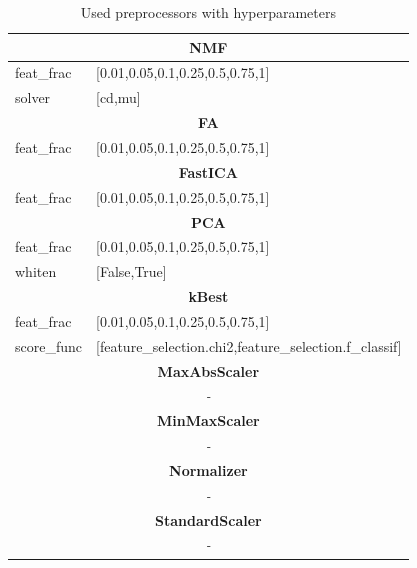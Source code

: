 {\footnotesize
\begin{longtable}{l l}

\caption{Used preprocessors with hyperparameters}\\

\midrule
\multicolumn{2}{c}{\textbf{NMF }} \\
\midrule

feat\_frac & [0.01,0.05,0.1,0.25,0.5,0.75,1] \\
solver & [cd,mu] \\
 
\midrule
\multicolumn{2}{c}{\textbf{FA }} \\
\midrule

feat\_frac & [0.01,0.05,0.1,0.25,0.5,0.75,1] \\
 
\midrule
\multicolumn{2}{c}{\textbf{FastICA }} \\
\midrule

feat\_frac & [0.01,0.05,0.1,0.25,0.5,0.75,1] \\

\midrule
\multicolumn{2}{c}{\textbf{PCA }} \\
\midrule

feat\_frac & [0.01,0.05,0.1,0.25,0.5,0.75,1] \\
whiten & [False,True] \\

\midrule
\multicolumn{2}{c}{\textbf{kBest }} \\
\midrule

feat\_frac & [0.01,0.05,0.1,0.25,0.5,0.75,1] \\
score\_func & [feature\_selection.chi2,feature\_selection.f\_classif] \\
 
\midrule
\multicolumn{2}{c}{\textbf{MaxAbsScaler  }} \\
\midrule
\multicolumn{2}{c}{\textit{-}} \\

\midrule
\multicolumn{2}{c}{\textbf{MinMaxScaler  }} \\
\midrule
\multicolumn{2}{c}{\textit{-}} \\

\midrule
\multicolumn{2}{c}{\textbf{Normalizer  }} \\
\midrule
\multicolumn{2}{c}{\textit{-}} \\

\midrule
\multicolumn{2}{c}{\textbf{StandardScaler  }} \\
\midrule
\multicolumn{2}{c}{\textit{-}} \\

\bottomrule

\end{longtable}
}


